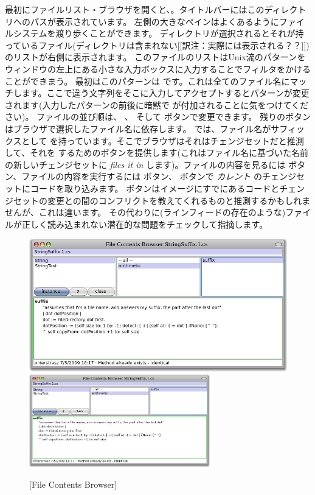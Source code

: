 \documentclass[a4paper,10pt,twoside]{book}
\begin{document}
最初にファイルリスト・ブラウザを開くと、。タイトルバーにはこのディレクトリへのパスが表示されています。
左側の大きなペインはよくあるようにファイルシステムを渡り歩くことができます。
ディレクトリが選択されるとそれが持っているファイル(ディレクトリは含まれない[[訳注：実際には表示される？？]])のリストが右側に表示されます。
このファイルのリストはUnix流のパターンをウィンドウの左上にある小さな入力ボックスに入力することでフィルタをかけることができまう。
最初はこのパターンは \ct{*} です。これは全てのファイル名にマッチします。ここで違う文字列をそこに入力してアクセプトするとパターンが変更されます(入力したパターンの前後に暗黙で \ct{*} が付加されることに気をつけてください)。
ファイルの並び順は、 、  そして  ボタンで変更できます。
残りのボタンはブラウザで選択したファイル名に依存します。
 では、ファイル名がサフィックスとして  を持っています。そこでブラウザはそれはチェンジセットだと推測して、それを  するためのボタンを提供します(これはファイル名に基づいた名前の新しいチェンジセットに \textit{files it in} します)。ファイルの内容を見るには  ボタン、ファイルの内容を実行するには  ボタン、 ボタンで \emph{カレント} のチェンジセットにコードを取り込みます。
 ボタンはイメージにすでにあるコードとチェンジセットの変更との間のコンフリクトを教えてくれるものと推測するかもしれませんが、これは違います。
その代わりに(ラインフィードの存在のような)ファイルが正しく読み込まれない潜在的な問題をチェックして指摘します。

\begin{figure}[btp]
	\begin{center}
	\ifluluelse
		{\includegraphics[width=\textwidth]{fileContentsBrowser}}
		{\includegraphics[width=0.7\textwidth]{fileContentsBrowser}}
	\end{center}
	\caption{[File Contents Browser]}
\end{figure}
\end{document}
